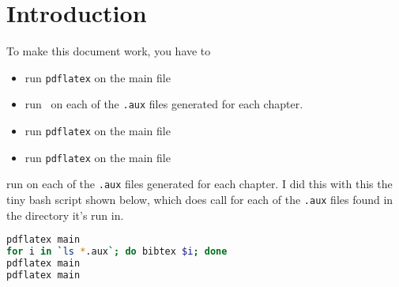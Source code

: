 \chapter{Introduction}
To make this document work, you have to
\begin{itemize}
\item run \verb+pdflatex+ on the main file
\item run \BibTeX\ on each of the \verb+.aux+ files generated for each chapter.
\item run \verb+pdflatex+ on the main file
\item run \verb+pdflatex+ on the main file
\end{itemize}
run \BibTeX on each of the \verb+.aux+ files generated for each chapter.
I did this with this the tiny bash script shown below, which does call \BibTeX for each of the \verb+.aux+ files found in the directory it's run in.
\begin{lstlisting}[language=bash]
pdflatex main
for i in `ls *.aux`; do bibtex $i; done
pdflatex main
pdflatex main
\end{lstlisting}

\cite{Author2013}

